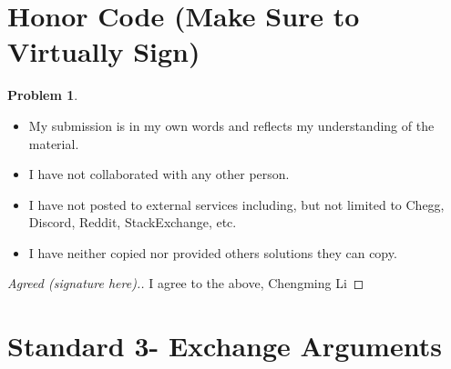 \documentclass[11pt]{article}
\theoremstyle{definition}
\theoremstyle{definition}
\newtheorem{required}{Problem}
\theoremstyle{definition}
\begin{document}
\section{Honor Code (Make Sure to Virtually Sign)} \label{HonorCode}

\begin{required}
\noindent 
\begin{itemize}
\item My submission is in my own words and reflects my understanding of the material.
\item I have not collaborated with any other person.
\item I have not posted to external services including, but not limited to Chegg, Discord, Reddit, StackExchange, etc.
\item I have neither copied nor provided others solutions they can copy.
\end{itemize}

\end{required}

\begin{proof}[Agreed (signature here).]
I agree to the above, Chengming Li
\end{proof}



\newpage
\section{Standard 3- Exchange Arguments}
\end{document}
